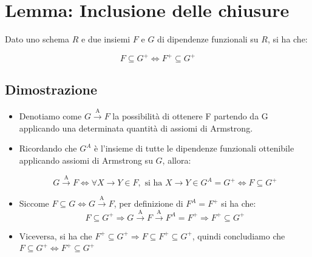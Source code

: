 \documentclass{article}
\begin{document}
\pagebreak
\section{Lemma: Inclusione delle chiusure}
Dato uno schema $R$ e due insiemi $F$ e $G$ di dipendenze funzionali su $R$, si ha che:\par 
\begin{equation}
F \subseteq G^+ \Leftrightarrow F^+ \subseteq G^+
\end{equation}
\subsection{Dimostrazione}
\begin{itemize}
  \item Denotiamo come $G \xrightarrow{\text{A}} F$ la possibilità di ottenere F partendo da G applicando una determinata quantità di assiomi di Armstrong.
  \item  Ricordando che $G^A$ è l'insieme di tutte le dipendenze funzionali ottenibile applicando assiomi di Armstrong su $G$, allora:\par
  \begin{equation}
    G \xrightarrow{\text{A}} F \Leftrightarrow \forall X \rightarrow Y \in F, \text{ si ha } X \rightarrow Y \in G^A = G^+ \Leftrightarrow F \subseteq G^+
  \end{equation}
  \item Siccome $F \subseteq G \Leftrightarrow G \xrightarrow{\text{A}} F$, per definizione di $F^A = F^+$ si ha che:
  \begin{equation}
    F \subseteq G^+ \Rightarrow G \xrightarrow{\text{A}} F \xrightarrow{\text{A}} F^A = F^+ \Rightarrow F^+ \subseteq G^+
  \end{equation}
  \item Viceversa, si ha che $F^+ \subseteq G^+ \Rightarrow F \subseteq F^+ \subseteq G^+$, quindi concludiamo che $F \subseteq G^+ \Leftrightarrow F^+ \subseteq G^+$

\end{itemize}







\pagebreak
\end{document}
